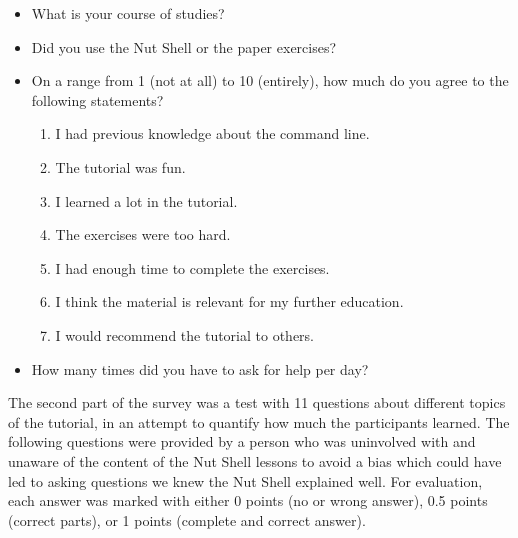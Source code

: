 \documentclass[paper=a4,twoside,abstract=on,cleardoublepage=empty,numbers=noenddot,toc=bib,11pt,appendixprefix=true]{scrreprt}
\begin{document}
\begin{itemize}
    \item What is your course of studies?
    \item Did you use the Nut Shell or the paper exercises?
    \item On a range from 1 (not at all) to 10 (entirely), how much do you agree to the following statements?
        \begin{enumerate}
            \item I had previous knowledge about the command line.
            \item The tutorial was fun.
            \item I learned a lot in the tutorial.
            \item The exercises were too hard.
            \item I had enough time to complete the exercises.
            \item I think the material is relevant for my further education.
            \item I would recommend the tutorial to others.
        \end{enumerate}
    \item How many times did you have to ask for help per day?
\end{itemize}

The second part of the survey was a test with 11 questions about different topics of the tutorial, in an attempt to quantify how much the participants learned. The following questions were provided by a person who was uninvolved with and unaware of the content of the Nut Shell lessons to avoid a bias which could have led to asking questions we knew the Nut Shell explained well. For evaluation, each answer was marked with either 0 points (no or wrong answer), 0.5 points (correct parts), or 1 points (complete and correct answer).
\end{document}
